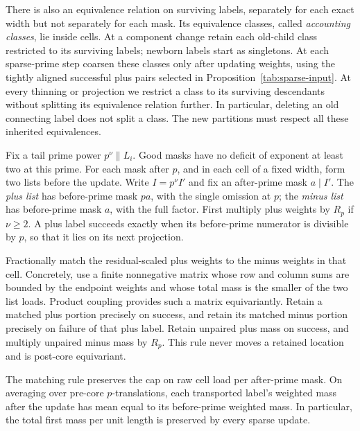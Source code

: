 There is also an equivalence relation on surviving labels, separately
for each exact width but not separately for each mask.  Its
equivalence classes, called \emph{accounting classes}, lie inside
cells.  At a component change retain each old-child class restricted
to its surviving labels; newborn labels start as singletons.  At
each sparse-prime step coarsen these classes only after updating
weights, using the tightly aligned successful plus pairs selected in
Proposition~\ref{tab:sparse-input}.  At every thinning or projection
we restrict a class to its surviving descendants without splitting
its equivalence relation further.  In particular, deleting an old
connecting label does not split a class.  The new partitions must
respect all these inherited equivalences.

Fix a tail prime power $p^\nu\parallel L_i$.  Good masks have no
deficit of exponent at least two at this prime.  For each mask after
$p$, and in each cell of a fixed width, form two lists before the
update.  Write $I=p^\nu I'$ and fix an after-prime mask $a\mid I'$.
The \emph{plus list} has before-prime mask $pa$, with the single
omission at $p$; the \emph{minus list} has before-prime mask $a$,
with the full factor.  First multiply plus weights by $R_p$ if $\nu\ge2$.
A plus label succeeds exactly when its before-prime numerator is
divisible by $p$, so that it lies on its next projection.

Fractionally match the residual-scaled plus weights to the minus
weights in that cell.  Concretely, use a finite nonnegative matrix
whose row and column sums are bounded by the endpoint weights and
whose total mass is the smaller of the two list loads.  Product
coupling provides such a matrix equivariantly.  Retain a matched
plus portion precisely on success, and retain its matched minus
portion precisely on failure of that plus label.  Retain unpaired
plus mass on success, and multiply unpaired minus mass by $R_p$.
This rule never moves a retained location and is post-core
equivariant.

\begin{lemma}
\label{tab:prime-update}
The matching rule preserves the cap on raw cell load per after-prime
mask.  On averaging over pre-core $p$-translations, each transported
label's weighted mass after the update has mean equal to its
before-prime weighted mass.  In particular, the total first mass per
unit length is preserved by every sparse update.
\end{lemma}

